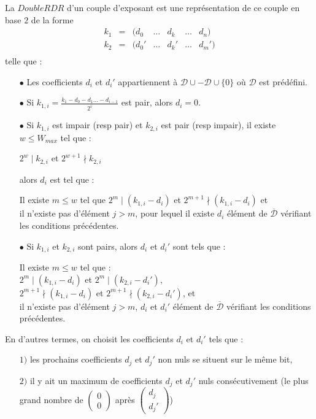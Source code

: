 \documentclass[12pt, a4paper]{memoir}
\newcommand{\doublezero}{\begin{pmatrix} 0 \\ 0 \end{pmatrix}}
\newcommand{\dbarre}{\overline{\mathcal{D}}}
\begin{document}
  \begin{Definition}
   La $DoubleRDR$ d'un couple d'exposant est une représentation de ce couple en base $2$ de la forme
$$\begin{array}{cccccccccc}
  k_1 & = & (d_0 & \ldots & d_k  & \ldots & d_n) \\
  k_2 & = & (d_0' & \ldots & d_k' & \ldots & d_m') \\
 \end{array}$$
 telle que :
   \begin{itemize}
    \item [$\bullet$] Les coefficients $d_i$ et $d_i'$ appartiennent à $\mathcal{D} \cup -\mathcal{D} \cup \{0\}$
    où $\mathcal{D}$ est prédéfini.
    \item [$\bullet$] Si $k_{1,i} = \frac{k_1-d_0-d_1 \ldots -d_{i-1}}{2^i}$ est pair, alors $d_i = 0$.
    \item [$\bullet$] Si $k_{1,i}$ est impair (resp pair) et $k_{2,i}$ est pair (resp impair), il existe 
    $w \leq W_{max}$ tel que :
   \begin{center}
    $2^{w} \mid k_{2,i}$ et $2^{w+1} \nmid k_{2,i}$
   \end{center}
   alors $d_i$ est tel que :
   \begin{center}
   Il existe $m \leq w$ tel que $2^{m} \mid (k_{1,i}-d_i)$ et $2^{m+1} \nmid (k_{1,i}-d_i)$ et \\
   il n'existe pas d'élément $j>m$, pour lequel il existe $d_i$ élément de $\dbarre$ vérifiant les conditions précédentes.
   \end{center}
   \item [$\bullet$] Si $k_{1,i}$ et $k_{2,i}$ sont pairs, alors $d_i$ et $d_i'$ sont tels que :
   \begin{center}
   Il existe $m \leq w$ tel que : \\
   $2^{m} \mid (k_{1,i}-d_i)$ et $2^{m} \mid (k_{2,i}-d_i')$, \\
   $2^{m+1} \nmid (k_{1,i}-d_i)$ et $2^{m+1} \nmid (k_{2,i}-d_i')$, et \\
   il n'existe pas d'élément $j>m$, $d_i$ et $d_i'$ élément de $\dbarre$ vérifiant les conditions précédentes.
   \end{center}
   \end{itemize}
  \end{Definition}
  
  \begin{Remarque}
   En d'autres termes, on choisit les coefficients $d_i$ et $d_i'$ tels que :
   \begin{itemize}
    \item [$1)$] les prochains coefficients $d_j$ et $d_j'$ non nuls se situent sur le même bit,
    \item [$2)$] il y ait un maximum de coefficients $d_j$ et $d_j'$ nuls consécutivement (le plus grand 
    nombre de $\doublezero$ après $\begin{pmatrix} d_j \\ d_j' \end{pmatrix}$)
   \end{itemize}
  \end{Remarque}
\end{document}
